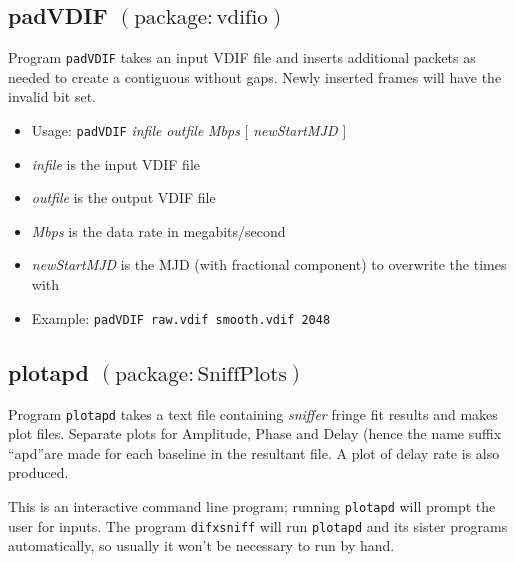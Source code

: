 
\subsection{padVDIF {\small $\mathrm{(package: vdifio)}$} \label{sec:padVDIF}}

Program {\tt padVDIF} takes an input VDIF file and inserts additional packets as needed to create a contiguous without gaps.
Newly inserted frames will have the invalid bit set.

\begin{itemize}
\item[] Usage: {\tt padVDIF} {\em infile} {\em outfile} {\em Mbps} $[$ {\em newStartMJD} $]$

\item[] {\em infile} is the input VDIF file
\item[] {\em outfile} is the output VDIF file
\item[] {\em Mbps} is the data rate in megabits/second
\item[] {\em newStartMJD} is the MJD (with fractional component) to overwrite the times with

\item[] Example: {\tt padVDIF raw.vdif smooth.vdif 2048}
\end{itemize}










\subsection{plotapd {\small $\mathrm{(package: SniffPlots)}$} \label{sec:plotapd}}

Program {\tt plotapd} takes a text file containing {\em sniffer} fringe fit results and makes plot files.
Separate plots for Amplitude, Phase and Delay (hence the name suffix ``apd''are made for each baseline in the resultant file.
A plot of delay rate is also produced.

This is an interactive command line program; running {\tt plotapd} will prompt the user for inputs.
The program {\tt difxsniff} will run {\tt plotapd} and its sister programs automatically, so usually it won't be necessary to run by hand.

